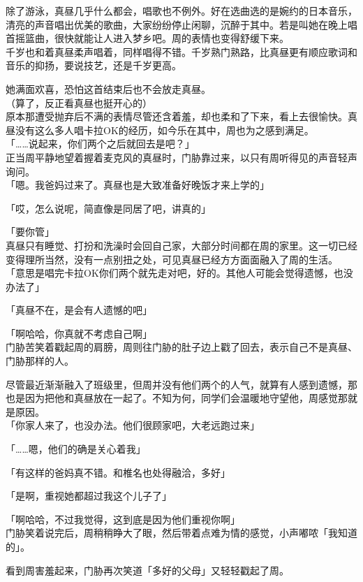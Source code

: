 除了游泳，真昼几乎什么都会，唱歌也不例外。好在选曲选的是婉约的日本音乐，清亮的声音唱出优美的歌曲，大家纷纷停止闲聊，沉醉于其中。若是叫她在晚上唱首摇篮曲，很快就能让人进入梦乡吧。周的表情也变得舒缓下来。\\

千岁也和着真昼柔声唱着，同样唱得不错。千岁熟门熟路，比真昼更有顺应歌词和音乐的抑扬，要说技艺，还是千岁更高。

她满面欢喜，恐怕这首结束后也不会放走真昼。\\

（算了，反正看真昼也挺开心的）\\

原本那遭受抛弃后不满的表情尽管还含着羞，却也柔和了下来，看上去很愉快。真昼没有这么多人唱卡拉OK的经历，如今乐在其中，周也为之感到满足。\\

「……说起来，你们两个之后就回去是吧？」\\

正当周平静地望着握着麦克风的真昼时，门胁靠过来，以只有周听得见的声音轻声询问。\\

「嗯。我爸妈过来了。真昼也是大致准备好晚饭才来上学的」

「哎，怎么说呢，简直像是同居了吧，讲真的」

「要你管」\\

真昼只有睡觉、打扮和洗澡时会回自己家，大部分时间都在周的家里。这一切已经变得理所当然，没有一点别扭之处，可见真昼已经方方面面融入了周的生活。\\

「意思是唱完卡拉OK你们两个就先走对吧，好的。其他人可能会觉得遗憾，也没办法了」

「真昼不在，是会有人遗憾的吧」

「啊哈哈，你真就不考虑自己啊」\\

门胁苦笑着戳起周的肩膀，周则往门胁的肚子边上戳了回去，表示自己不是真昼、门胁那样的人。

尽管最近渐渐融入了班级里，但周并没有他们两个的人气，就算有人感到遗憾，那也是因为把他和真昼放在一起了。不知为何，同学们会温暖地守望他，周感觉那就是原因。\\

「你家人来了，也没办法。他们很顾家吧，大老远跑过来」

「……嗯，他们的确是关心着我」

「有这样的爸妈真不错。和椎名也处得融洽，多好」

「是啊，重视她都超过我这个儿子了」

「啊哈哈，不过我觉得，这到底是因为他们重视你啊」\\

门胁笑着说完后，周稍稍睁大了眼，然后带着点难为情的感觉，小声嘟哝「我知道的」。

看到周害羞起来，门胁再次笑道「多好的父母」又轻轻戳起了周。
